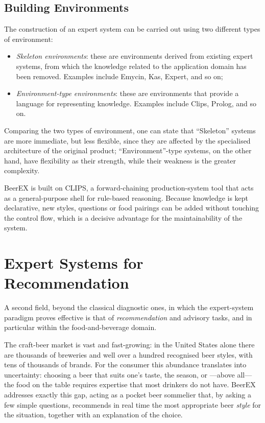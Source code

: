 \subsection{Building Environments}

The construction of an expert system can be carried out using two different types
of environment:

\begin{itemize}
    \item \emph{Skeleton environments}: these are environments derived from
    existing expert systems, from which the knowledge related to the application
    domain has been removed. Examples include Emycin, Kas, Expert, and so on;

    \item \emph{Environment-type environments}: these are environments that
    provide a language for representing knowledge. Examples include Clips,
    Prolog, and so on.
\end{itemize}

Comparing the two types of environment, one can state that ``Skeleton'' systems
are more immediate, but less flexible, since they are affected by the
specialised architecture of the original product; ``Environment''-type systems,
on the other hand, have flexibility as their strength, while their weakness is
the greater complexity.

BeerEX is built on CLIPS, a forward-chaining production-system tool that acts as
a general-purpose shell for rule-based reasoning. Because knowledge is kept
declarative, new styles, questions or food pairings can be added without
touching the control flow, which is a decisive advantage for the maintainability
of the system.


\section{Expert Systems for Recommendation}

A second field, beyond the classical diagnostic ones, in which the expert-system
paradigm proves effective is that of \emph{recommendation} and advisory tasks,
and in particular within the food-and-beverage domain.

The craft-beer market is vast and fast-growing: in the United States alone there
are thousands of breweries and well over a hundred recognised beer styles, with
tens of thousands of brands. For the consumer this abundance translates into
uncertainty: choosing a beer that suits one's taste, the season, or ---above
all--- the food on the table requires expertise that most drinkers do not have.
BeerEX addresses exactly this gap, acting as a pocket beer sommelier that, by
asking a few simple questions, recommends in real time the most appropriate beer
\emph{style} for the situation, together with an explanation of the choice.

